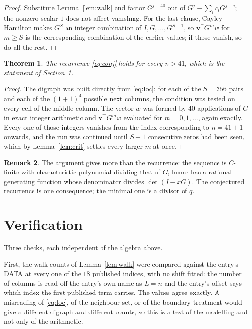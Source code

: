 \documentclass[11pt,a4paper]{article}
\theoremstyle{plain}
\newtheorem{theorem}{Theorem}
\theoremstyle{definition}
\newtheorem{remark}[theorem]{Remark}
\begin{document}
\begin{proof}
Substitute Lemma~\ref{lem:walk} and factor $G^{j-40}$ out of
$G^{j}-\sum_ic_iG^{j-i}$; the nonzero scalar $1$ does not affect
vanishing. For the last clause, Cayley--Hamilton makes $G^{S}$ an integer combination of
$I,G,\dots,G^{S-1}$, so $\mathbf{v}^{\!\top}G^{m}w$ for $m\ge S$ is the corresponding
combination of the earlier values; if those vanish, so do all the rest.
\end{proof}

\begin{theorem}
The recurrence \eqref{eq:conj} holds for every $n>41$, which is the statement of
Section~1.
\end{theorem}

\begin{proof}
The digraph was built directly from \eqref{eq:loc}: for each of the $S=256$ pairs and each
of the $(1+1)^{4}$ possible next columns, the condition was tested on every cell of
the middle column. The vector $w$ was formed by $40$ applications of $G$ in exact integer
arithmetic and $\mathbf{v}^{\!\top}G^{m}w$ evaluated for $m=0,1,\dots$, again exactly.
Every one of those integers vanishes from the index corresponding to $n=41+1$ onwards,
and the run was continued until $S+1$ consecutive zeros had been seen, which by
Lemma~\ref{lem:crit} settles every larger $m$ at once.
\end{proof}

\begin{remark}
The argument gives more than the recurrence: the sequence is $C$-finite with characteristic
polynomial dividing that of $G$, hence has a rational generating function whose denominator
divides $\det(I-xG)$. The conjectured recurrence is one consequence; the minimal one is a
divisor of $q$.
\end{remark}

\section{Verification}

Three checks, each independent of the algebra above.

First, the walk counts of Lemma~\ref{lem:walk} were compared against the entry's DATA at
every one of the $18$ published indices, with no shift fitted: the number of columns is
read off the entry's own name as $L=n$ and the entry's offset says which index the first
published term carries. The values agree exactly. A misreading of \eqref{eq:loc}, of the
neighbour set, or of the boundary treatment would give a different digraph and different
counts, so this is a test of the modelling and not only of the arithmetic.
\end{document}
